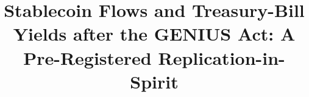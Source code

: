 \documentclass[conference]{IEEEtran}
\begin{document}
\title{Stablecoin Flows and Treasury-Bill Yields after the GENIUS Act: A Pre-Registered Replication-in-Spirit}

\author{}

\maketitle












\appendices




\end{document}
